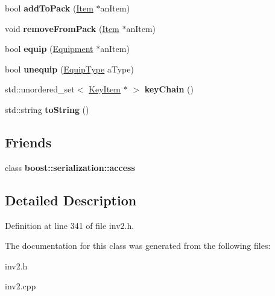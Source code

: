 \begin{DoxyCompactItemize}
bool {\bfseries add\+To\+Pack} (\hyperlink{class_item}{Item} $\ast$an\+Item)
\item 
\hypertarget{class_inventory_a061ffa9b738372bfcaee6d8ea5140d05}{}\label{class_inventory_a061ffa9b738372bfcaee6d8ea5140d05} 
void {\bfseries remove\+From\+Pack} (\hyperlink{class_item}{Item} $\ast$an\+Item)
\item 
\hypertarget{class_inventory_a7d9e9f5217573c9052484543e481ead1}{}\label{class_inventory_a7d9e9f5217573c9052484543e481ead1} 
bool {\bfseries equip} (\hyperlink{class_equipment}{Equipment} $\ast$an\+Item)
\item 
\hypertarget{class_inventory_aa5cd8a3fd8309a9f2a23b595b24b6fb5}{}\label{class_inventory_aa5cd8a3fd8309a9f2a23b595b24b6fb5} 
bool {\bfseries unequip} (\hyperlink{class_equip_type}{Equip\+Type} a\+Type)
\item 
\hypertarget{class_inventory_a061da226215e169d1b9f0c05e9d84a1d}{}\label{class_inventory_a061da226215e169d1b9f0c05e9d84a1d} 
std\+::unordered\+\_\+set$<$ \hyperlink{class_key_item}{Key\+Item} $\ast$ $>$ {\bfseries key\+Chain} ()
\item 
\hypertarget{class_inventory_aa9cfa40da293bf94acc9f0c8fbe9a7d1}{}\label{class_inventory_aa9cfa40da293bf94acc9f0c8fbe9a7d1} 
std\+::string {\bfseries to\+String} ()
\end{DoxyCompactItemize}
\subsection*{Friends}
\begin{DoxyCompactItemize}
\item 
\hypertarget{class_inventory_ac98d07dd8f7b70e16ccb9a01abf56b9c}{}\label{class_inventory_ac98d07dd8f7b70e16ccb9a01abf56b9c} 
class {\bfseries boost\+::serialization\+::access}
\end{DoxyCompactItemize}


\subsection{Detailed Description}


Definition at line 341 of file inv2.\+h.



The documentation for this class was generated from the following files\+:\begin{DoxyCompactItemize}
\item 
inv2.\+h\item 
inv2.\+cpp\end{DoxyCompactItemize}
